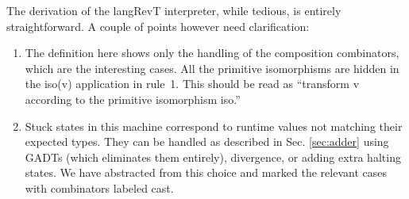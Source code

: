 \documentclass{llncs}
\begin{document}

The derivation of the {{langRevT}} interpreter, while tedious, is
entirely straightforward.  A couple of points however need clarification:

\begin{enumerate}

\item The definition here shows only the handling of the composition
  combinators, which are the interesting cases. All the primitive
  isomorphisms are hidden in the {{iso(v)}} application in {{rule~1}}. This
  should be read as ``transform {{v}} according to the primitive isomorphism
  {{iso}}.'' 

\item Stuck states in this machine correspond to runtime values not
  matching their expected types. They can be handled as described in
  Sec. \ref{sec:adder} using GADTs (which eliminates them entirely),
  divergence, or adding extra halting states. We have abstracted from
  this choice and marked the relevant cases with combinators labeled
  {{cast}}.

\end{enumerate}






\end{document}
